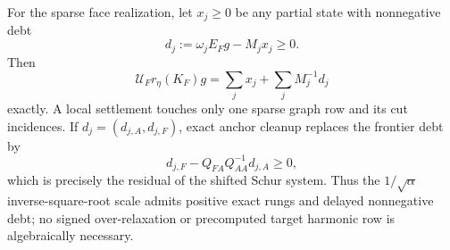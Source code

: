 \begin{proposition}
For the sparse face realization, let $x_j\geq0$ be any partial state with
nonnegative debt
\begin{equation*}
 d_j:=\omega_jE_Fg-M_jx_j\geq0.
\end{equation*}
Then
\begin{equation}
 \mathcal U_Fr_\eta(K_F)g
 =\sum_jx_j+\sum_jM_j^{-1}d_j
 \label{eq:positive-rung-debt-invariant}
\end{equation}
exactly.  A local settlement touches only one sparse graph row and its cut
incidences.  If $d_j=(d_{j,A},d_{j,F})$, exact anchor cleanup replaces the
frontier debt by
\begin{equation}
 d_{j,F}-Q_{FA}Q_{AA}^{-1}d_{j,A}\geq0,
 \label{eq:positive-rung-anchor-cleanup}
\end{equation}
which is precisely the residual of the shifted Schur system.  Thus the
$1/\sqrt\alpha$ inverse-square-root scale admits positive exact rungs and
delayed nonnegative debt; no signed over-relaxation or precomputed target
harmonic row is algebraically necessary.
\end{proposition}

